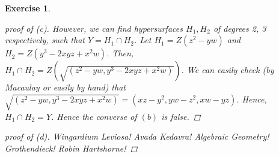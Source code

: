 \documentclass[12pt,letterpaper]{article}
\newtheorem{problem}{Exercise}[section]
\theoremstyle{definition}
\theoremstyle{remark}
\numberwithin{equation}{section}
\numberwithin{figure}{problem}
\begin{document}
\begin{problem}
\begin{proof} [proof of (c)]
However, we can find hypersurfaces $H_1, H_2$ of degrees 2, 3 respectively, such that $Y = H_1 \cap H_2$. Let $H_1 = Z(z^2-yw)$ and $H_2 = Z(y^3-2xyz+x^2w)$. Then, $H_1 \cap H_2 = Z(\sqrt{(z^2-yw, y^3-2xyz+x^2w)})$. We can easily check (by Macaulay or easily by hand) that $\sqrt{(z^2-yw, y^3-2xyz+x^2w)} = (xz-y^2, yw-z^2, xw-yz)$. Hence, $H_1 \cap H_2 = Y$. Hence the converse of $(b)$ is false. 

\end{proof}

\begin{proof} [proof of (d)] 

Wingardium Leviosa! Avada Kedavra! Algebraic Geometry! Grothendieck! Robin Hartshorne!
\end{proof}



\end{problem}


\printbibliography
\end{document}
